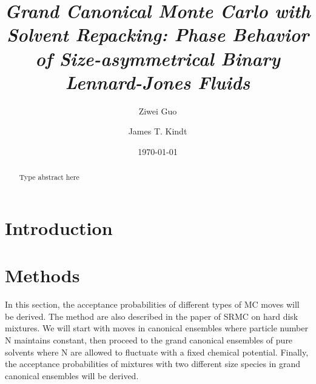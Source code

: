 \documentclass[aip,jcp,12pt]{revtex4-1}
\begin{document}
\title{
\textit{Grand Canonical Monte Carlo with Solvent Repacking: Phase Behavior of Size-asymmetrical Binary Lennard-Jones Fluids
}}
\author{Ziwei Guo}
\address{Department of Chemistry, Emory University, Atlanta, Georgia 30322, USA}
\author{James T. Kindt}
\address{Department of Chemistry, Emory University, Atlanta, Georgia 30322, USA}
\date{\today}

\begin{abstract}
Type abstract here
\end{abstract}


\maketitle



\section{Introduction}

\section{Methods}
In this section, the acceptance probabilities of different types of MC moves will be derived. The method are also described in the paper of SRMC on hard disk mixtures\cite{kindt:2015}. We will start with moves in canonical ensembles where particle number N maintains constant, then proceed to the grand canonical ensembles of pure solvents where N are allowed to fluctuate with a fixed chemical potential. Finally, the acceptance probabilities of mixtures with two different size species in grand canonical ensembles will be derived.
\end{document}
